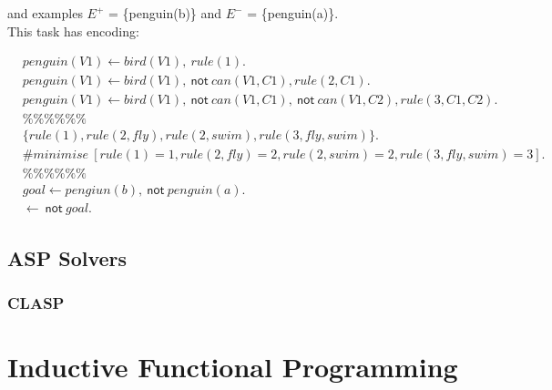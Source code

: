 and examples $E^+$ = \{penguin(b)\} and $E^-$ = \{penguin(a)\}. \\
This task has encoding:

\begin{align*}
&penguin(V1) \gets bird(V1), \: rule(1).\\
&penguin(V1) \gets bird(V1), \: \textsf{not} \: can(V1, C1), rule(2, C1).\\
&penguin(V1) \gets bird(V1), \: \textsf{not} \: can(V1, C1), \: \textsf{not} \: can(V1, C2), rule(3, C1, C2).\\
&\%\%\%\%\%\%\\
&\{rule(1), rule(2, fly), rule(2, swim), rule(3, fly, swim)\}.\\
&\#minimise \: [rule(1)=1, rule(2, fly) = 2, rule(2, swim) = 2, rule(3, fly, swim) = 3]. \\
&\%\%\%\%\%\%\\
&goal \gets pengiun(b), \: \textsf{not} \: penguin(a).\\
&\gets \: \textsf{not} \: goal.
\end{align*}

\subsection{ASP Solvers}

\subsubsection{CLASP}

\section{Inductive Functional Programming}

